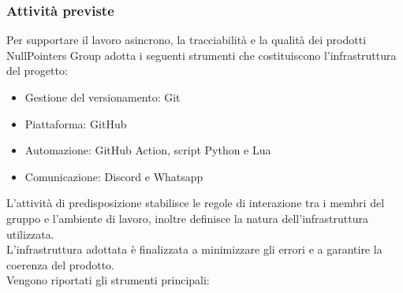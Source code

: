 \subsubsection{Attività previste}
Per supportare il lavoro asincrono, la tracciabilità e la qualità dei prodotti NullPointers Group adotta i seguenti strumenti che costituiscono l’infrastruttura del progetto:
\begin{itemize}[itemsep=3pt, parsep=1pt, label=$\scriptstyle\bullet$]
    \item Gestione del versionamento: Git
    \item Piattaforma: GitHub
    \item Automazione: GitHub Action, script Python e Lua
    \item Comunicazione: Discord e Whatsapp
\end{itemize}

L’attività di predisposizione stabilisce le regole di interazione tra i membri del gruppo e l’ambiente di lavoro, inoltre definisce la natura dell’infrastruttura utilizzata.\\
L’infrastruttura adottata è finalizzata a minimizzare gli errori e a garantire la coerenza del prodotto.\\
Vengono riportati gli strumenti principali:

